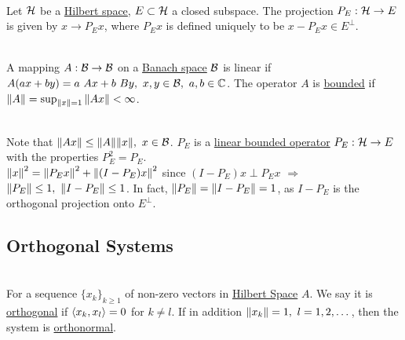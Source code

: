 \begin{definition}\ \\
Let $\mathcal{H}$ be a \underline{Hilbert space}, $E \subset \mathcal{H}$ a closed subspace. The projection $P_E: \mathcal{H} \to E$ is given by $x \to P_E x$, where $P_E x$ is defined uniquely to be $x - P_E x \in E^\perp$. 
\end{definition}

\begin{definition}\ \\
A mapping $A: \mathcal{B} \to \mathcal{B}$ on a \underline{Banach space} $\mathcal{B}$ is linear if $A(ax + by) = a\ Ax + b\ By,\ x,y \in \Bs,\ a,b \in \C$. The operator $A$ is \underline{bounded} if $\norm{A} = \sup_{\norm{x} = 1} \norm{Ax} < \infty$.
\end{definition}
\begin{remark}\ \\
    Note that $\norm{Ax} \leq \norm{A} \norm{x},\ x \in \Bs$. $P_E$ is a \underline{linear bounded operator} $P_E: \mathcal{H} \to E$ with the properties $P^2_E = P_E$.\\
    $\norm{x}^2 = \norm{P_E x}^2 + \norm{(I - P_E) x}^2$ since $(I - P_E)x \perp P_E x$ $\Rightarrow$ $\norm{P_E} \leq 1,\ \norm{I - P_E} \leq 1$. In fact, $\norm{P_E} = \norm{I - P_E} = 1$, as $I - P_E$ is the orthogonal projection onto $E^\perp$.
\end{remark}

\vspace{12pt}
\subsection{Orthogonal Systems}

\begin{definition}\ \\
For a sequence $\{x_k\}_{k \geq 1}$ of non-zero vectors in \underline{Hilbert Space} $A$. We say it is \underline{orthogonal} if $\left\langle x_k, x_l \right\rangle = 0$ for $k \neq l$. If in addition $\norm{x_k} = 1,\ l=1,2,\dots$, then the system is \underline{orthonormal}.
\end{definition}

